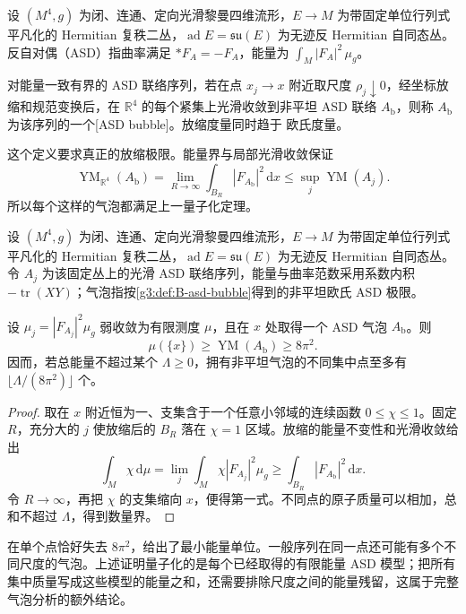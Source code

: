 \begin{definition}\label{g3:def:B-asd-bubble}
	设 \((M^4,g)\) 为闭、连通、定向光滑黎曼四维流形，\(E\to M\) 为带固定单位行列式平凡化的 Hermitian 复秩二丛，\(\operatorname{ad}E=\mathfrak{su}(E)\) 为无迹反 Hermitian 自同态丛。
	反自对偶（ASD）指曲率满足 \(*F_A=-F_A\)，能量为 \(\int_M|F_A|^2\,\mu_g\)。

 对能量一致有界的 ASD 联络序列，若在点 \(x_j\to x\) 附近取尺度 \(\rho_j\downarrow0\)，经坐标放缩和规范变换后，在 \(\mathbb R^4\) 的每个紧集上光滑收敛到非平坦 ASD 联络 \(A_{\mathrm b}\)，则称 \(A_{\mathrm b}\) 为该序列的一个[ASD bubble]。放缩度量同时趋于 欧氏度量。
\end{definition}

这个定义要求真正的放缩极限。能量界与局部光滑收敛保证
\[
 \operatorname{YM}_{\mathbb R^4}(A_{\mathrm b})
 =\lim_{R\to\infty}\int_{B_R}|F_{A_{\mathrm b}}|^2\,\mathrm dx
 \le\sup_j\operatorname{YM}(A_j).
\]
所以每个这样的气泡都满足上一量子化定理。

\begin{proposition}\label{g3:prop:B-bubble-energy-cost}
	设 \((M^4,g)\) 为闭、连通、定向光滑黎曼四维流形，\(E\to M\) 为带固定单位行列式平凡化的 Hermitian 复秩二丛，\(\operatorname{ad}E=\mathfrak{su}(E)\) 为无迹反 Hermitian 自同态丛。
	令 \(A_j\) 为该固定丛上的光滑 ASD 联络序列，能量与曲率范数采用系数内积 \(-\operatorname{tr}(XY)\)；气泡指按\cref{g3:def:B-asd-bubble}得到的非平坦欧氏 ASD 极限。

 设 \(\mu_j=|F_{A_j}|^2\mu_g\) 弱收敛为有限测度 \(\mu\)，且在 \(x\) 处取得一个 ASD 气泡 \(A_{\mathrm b}\)。则
 \[
  \mu(\{x\})\ge\operatorname{YM}(A_{\mathrm b})\ge8\pi^2.
 \]
 因而，若总能量不超过某个 \(\Lambda\ge0\)，拥有非平坦气泡的不同集中点至多有 \(\lfloor\Lambda/(8\pi^2)\rfloor\) 个。
\end{proposition}
\begin{proof}
 取在 \(x\) 附近恒为一、支集含于一个任意小邻域的连续函数 \(0\le\chi\le1\)。固定 \(R\)，充分大的 \(j\) 使放缩后的 \(B_R\) 落在 \(\chi=1\) 区域。放缩的能量不变性和光滑收敛给出
 \[
  \int_M\chi\,\mathrm d\mu
  =\lim_j\int_M\chi|F_{A_j}|^2\mu_g
  \ge\int_{B_R}|F_{A_{\mathrm b}}|^2\,\mathrm dx.
 \]
 令 \(R\to\infty\)，再把 \(\chi\) 的支集缩向 \(x\)，便得第一式。不同点的原子质量可以相加，总和不超过 \(\Lambda\)，得到数量界。
\end{proof}

在单个点恰好失去 \(8\pi^2\)，给出了最小能量单位。一般序列在同一点还可能有多个不同尺度的气泡。上述证明量子化的是每个已经取得的有限能量 ASD 模型；把所有集中质量写成这些模型的能量之和，还需要排除尺度之间的能量残留，这属于完整气泡分析的额外结论。

